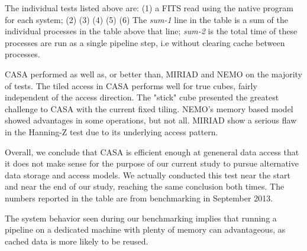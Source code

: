 \documentclass{article}
\begin{document}
The individual tests listed above are: (1) a FITS read using the native program for each system;
(2)
(3)
(4)
(5)
(6)
The {\it sum-1} line in the table is 
a sum of the individual processes in the table above that line; {\it sum-2} is  the total
time of these processes are run as a single pipeline step, i.e without clearing cache
between processes.

CASA performed as well as, or better than, MIRIAD
and NEMO on the majority of tests.
The tiled access in CASA performs well for true cubes, fairly
independent of the access direction. 
The "stick" cube presented the greatest challenge to CASA with
the current fixed tiling. NEMO's memory based model showed
advantages in some operations, but not all. MIRIAD show a serious
flaw in the Hanning-Z test due to its underlying access pattern.

Overall, we conclude that CASA is efficient enough at geneneral data 
access that
it does not make sense for the purpose of our current study to pursue
alternative data storage and access models. 
We actually conducted this
test near the start and near the end of our study, reaching the
same conclusion both times. The numbers reported in the table are from
benchmarking in September 2013.

The system behavior seen during our benchmarking
implies that running a pipeline on a dedicated machine
with plenty of memory can advantageous, as cached data is more likely
to be reused. 
\end{document}
